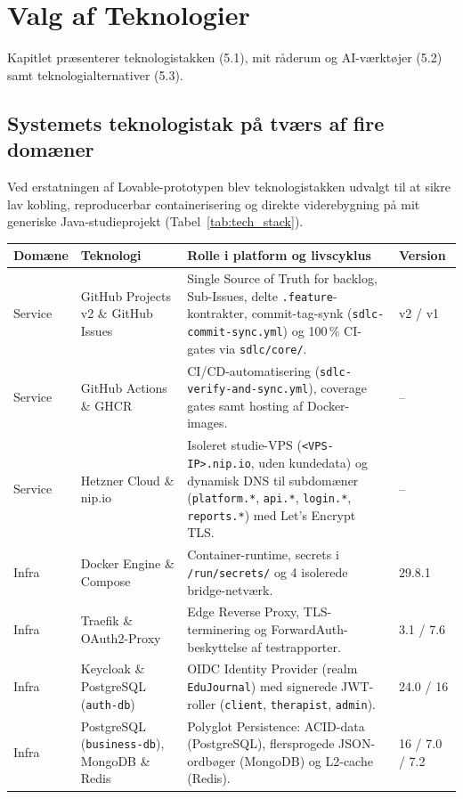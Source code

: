 \documentclass[11pt,a4paper]{article}
\begin{document}
\section{Valg af Teknologier}
Kapitlet præsenterer teknologistakken (5.1), mit råderum og AI-værktøjer (5.2) samt teknologialternativer (5.3).

\subsection{Systemets teknologistak på tværs af fire domæner}
Ved erstatningen af Lovable-prototypen blev teknologistakken udvalgt til at sikre lav kobling, reproducerbar containerisering og direkte viderebygning på mit generiske Java-studieprojekt (Tabel~\ref{tab:tech_stack}).

\begin{table}[H]
\centering
\small
\begin{tabularx}{\textwidth}{P{2.0cm} P{3.6cm} Y P{2.2cm}}
\toprule
\textbf{Domæne} & \textbf{Teknologi} & \textbf{Rolle i platform og livscyklus} & \textbf{Version} \\
\midrule
Service & GitHub Projects v2 \& GitHub Issues & Single Source of Truth for backlog, Sub-Issues, delte \texttt{.feature}-kontrakter, commit-tag-synk (\texttt{sdlc-commit-sync.yml}) og 100\,\% CI-gates via \texttt{sdlc/core/}. & v2 / v1 \\
\midrule
Service & GitHub Actions \& GHCR & CI/CD-automatisering (\texttt{sdlc-verify-and-sync.yml}), coverage gates samt hosting af Docker-images. & -- \\
\midrule
Service & Hetzner Cloud \& nip.io & Isoleret studie-VPS (\texttt{<VPS-IP>.nip.io}, uden kundedata) og dynamisk DNS til subdomæner (\texttt{platform.*}, \texttt{api.*}, \texttt{login.*}, \texttt{reports.*}) med Let's Encrypt TLS. & -- \\
\midrule
Infra & Docker Engine \& Compose & Container-runtime, secrets i \texttt{/run/secrets/} og 4 isolerede bridge-netværk. & 29.8.1 \\
\midrule
Infra & Traefik \& OAuth2-Proxy & Edge Reverse Proxy, TLS-terminering og ForwardAuth-beskyttelse af testrapporter. & 3.1 / 7.6 \\
\midrule
Infra & Keycloak \& PostgreSQL (\texttt{auth-db}) & OIDC Identity Provider (realm \texttt{EduJournal}) med signerede JWT-roller (\texttt{client}, \texttt{therapist}, \texttt{admin}). & 24.0 / 16 \\
\midrule
Infra & PostgreSQL (\texttt{business-db}), MongoDB \& Redis & Polyglot Persistence: ACID-data (PostgreSQL), flersprogede JSON-ordbøger (MongoDB) og L2-cache (Redis). & 16 / 7.0 / 7.2 \\

\end{tabularx}
\end{table}
\end{document}
